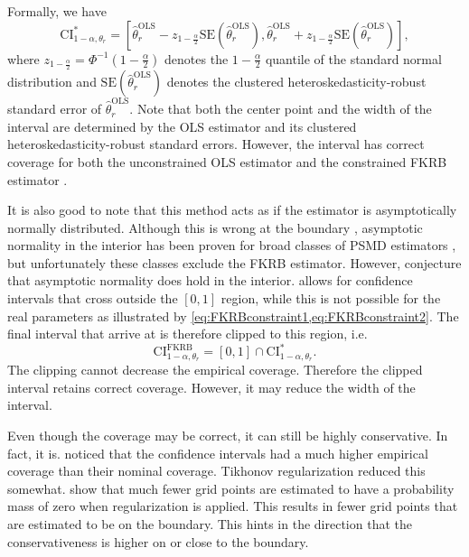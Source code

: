 Formally, we have
\begin{equation}
\label{eq:CIOLS}
    \mathrm{CI}^{*}_{1-\alpha,\theta_r} = \left[\hat{\theta}_{r}^{\mathrm{OLS}} - z_{1-\frac{\alpha}{2}}\mathrm{SE}\left(\hat{\theta}_{r}^{\mathrm{OLS}}\right),\hat{\theta}_{r}^{\mathrm{OLS}} + z_{1-\frac{\alpha}{2}}\mathrm{SE}\left(\hat{\theta}_{r}^{\mathrm{OLS}}\right)\right],
\end{equation}
where $z_{1-\frac{\alpha}{2}} = \Phi^{-1}(1-\frac{\alpha}{2})$ denotes the $1-\frac{\alpha}{2}$ quantile of the standard normal distribution and $\mathrm{SE}(\hat{\theta}_{r}^{\mathrm{OLS}})$ denotes the clustered heteroskedasticity-robust standard error of $\hat{\theta}_{r}^{\mathrm{OLS}}$.
Note that both the center point and the width of the interval are determined by the OLS estimator and its clustered heteroskedasticity-robust standard errors.
However, the interval has correct coverage for both the unconstrained OLS estimator and the constrained FKRB estimator \citep{AndrewsGuggenberger2010Applications,FoxKimRyanBajari2011}.

It is also good to note that this method acts as if the estimator is asymptotically normally distributed. 
Although this is wrong at the boundary \citep{Andrews1999}, asymptotic normality in the interior has been proven for broad classes of PSMD estimators \citep{ChenPouzo2015}, but unfortunately these classes exclude the FKRB estimator.
However, \citet[page~241]{FoxKimYang2016} conjecture that asymptotic normality does hold in the interior. 
 allows for confidence intervals that cross outside the $[0,1]$ region, while this is not possible for the real parameters as illustrated by \cref{eq:FKRBconstraint1,eq:FKRBconstraint2}.
The final interval that \citet{FoxKimRyanBajari2011} arrive at is therefore clipped to this region, i.e. 
\begin{equation}
\label{eq:CIFKRB}
    \mathrm{CI}^{\mathrm{FKRB}}_{1-\alpha,\theta_r} = [0,1] \cap \mathrm{CI}^{*}_{1-\alpha, \theta_r}.
\end{equation}
The clipping cannot decrease the empirical coverage.
Therefore the clipped interval retains correct coverage.
However, it may reduce the width of the interval.

Even though the coverage may be correct, it can still be highly conservative.
In fact, it is.
\citet{FoxKimRyanBajari2011} noticed that the confidence intervals had a much higher empirical coverage than their nominal coverage.
Tikhonov regularization reduced this somewhat.
\citet{HeissHetzeneckerOsterhaus2022} show that much fewer grid points are estimated to have a probability mass of zero when regularization is applied.
This results in fewer grid points that are estimated to be on the boundary.
This hints in the direction that the conservativeness is higher on or close to the boundary.

